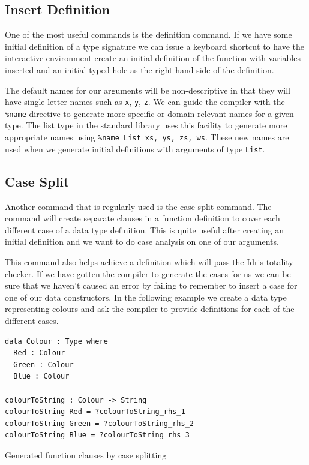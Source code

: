 \documentclass[a4paper, notitlepage]{report}
\begin{document}
\subsection{Insert Definition}
\label{sec:org958f9cd}
One of the most useful commands is the definition command. If we have some
initial definition of a type signature we can issue a keyboard shortcut to have
the interactive environment create an initial definition of the function with
variables inserted and an initial typed hole as the right-hand-side of the
definition.

The default names for our arguments will be non-descriptive in that they will
have single-letter names such as \texttt{x}, \texttt{y}, \texttt{z}. We can guide the compiler with the
\texttt{\%name} directive to generate more specific or domain relevant names for a given
type. The list type in the standard library uses this facility to generate more
appropriate names using \texttt{\%name List xs, ys, zs, ws}. These new names are used when
we generate initial definitions with arguments of type \texttt{List}.

\subsection{Case Split}
\label{sec:orgadb27a8}
Another command that is regularly used is the case split command. The command
will create separate clauses in a function definition to cover each different
case of a data type definition. This is quite useful after creating an initial
definition and we want to do case analysis on one of our arguments.

This command also helps achieve a definition which will pass the Idris totality
checker. If we have gotten the compiler to generate the cases for us we can be
sure that we haven't caused an error by failing to remember to insert a case for
one of our data constructors. In the following example we create a data type
representing colours and ask the compiler to provide definitions for each of the
different cases.

\begin{listing}[H]
\begin{verbatim}
data Colour : Type where
  Red : Colour
  Green : Colour
  Blue : Colour

colourToString : Colour -> String
colourToString Red = ?colourToString_rhs_1
colourToString Green = ?colourToString_rhs_2
colourToString Blue = ?colourToString_rhs_3
\end{verbatim}
\caption{Generated function clauses by case splitting}
\end{listing}
\end{document}
